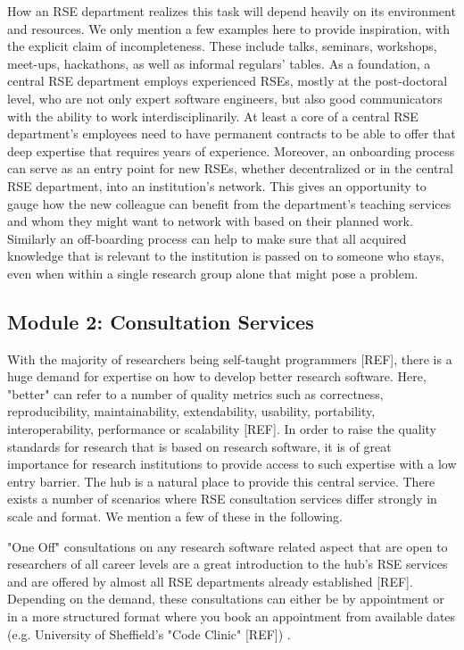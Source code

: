 \documentclass[a4paper]{article}
\begin{document}
How an RSE department realizes this task will depend heavily on its environment and resources. We only mention a few examples here to provide inspiration, with the explicit claim of incompleteness.
These include talks, seminars, workshops, meet-ups, hackathons, as well as informal regulars' tables.
As a foundation, a central RSE department employs experienced RSEs, mostly at the post-doctoral level, who are not only expert software engineers, but also good communicators with the ability to work interdisciplinarily.
At least a core of a central RSE department's employees need to have permanent contracts to be able to offer that deep expertise that requires years of experience.
Moreover, an onboarding process can serve as an entry point for new RSEs, whether decentralized or in the central RSE department, into an institution's network.
This gives an opportunity to gauge how the new colleague can benefit from the department's teaching services and whom they might want to network with based on their planned work.
Similarly an off-boarding process can help to make sure that all acquired knowledge that is relevant to the institution is passed on to someone who stays, even when within a single research group alone that might pose a problem.

\subsection{Module 2: Consultation Services}
\label{sec:consultation}

With the majority of researchers being self-taught programmers [REF], there is a huge demand for expertise on how to develop better research software.
Here, "better" can refer to a number of quality metrics such as correctness, reproducibility, maintainability, extendability, usability, portability, interoperability, performance or scalability [REF].
In order to raise the quality standards for research that is based on research software, it is of great importance for research institutions to provide access to such expertise with a low entry barrier.
The hub is a natural place to provide this central service.
There exists a number of scenarios where RSE consultation services differ strongly in scale and format.
We mention a few of these in the following.

"One Off" consultations on any research software related aspect that are open to researchers of all career levels are
a great introduction to the hub's RSE services and are offered by almost all RSE departments already established [REF].
Depending on the demand, these consultations can either be by appointment or in a more structured format where you book an appointment from available dates (e.g. University of Sheffield's "Code Clinic" [REF]) .
\end{document}
